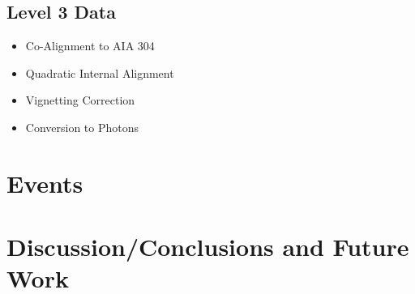 	       


    \subsection{Level 3 Data}
        \begin{itemize}
            \item Co-Alignment to AIA 304
            \item Quadratic Internal Alignment
            \item Vignetting Correction
            \item Conversion to Photons
        \end{itemize}

\section{Events}

\section{Discussion/Conclusions and Future Work}

